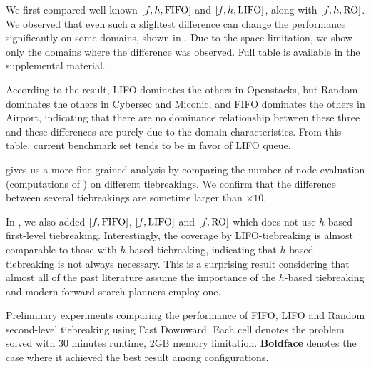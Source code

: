 We first compared well known $[f,h,\mbox{FIFO}]$ and $[f,h,\mbox{LIFO}]$, along with
$[f,h,\mbox{RO}]$.
We observed that even such a slightest difference
can change the performance significantly on some domains, shown in
. Due to the space limitation, we show only the
domains where the difference was observed. Full table is available in
the supplemental material.

According to the result, LIFO dominates the others in Openstacks, but
Random dominates the others in Cybersec and Miconic, and FIFO dominates the others
in Airport, indicating that there are no dominance relationship between
these three and these differences are purely due to the
domain characteristics.
From this table, current benchmark set tends to be in favor of LIFO queue.

 gives us a more fine-grained analysis by comparing the
number of node evaluation (computations of \lmcut) on
different tiebreakings. We confirm that the difference between several
tiebreakings are sometime larger than $\times 10$.

In , we also added $[f,\mbox{FIFO}]$, $[f,\mbox{LIFO}]$ and
$[f,\mbox{RO}]$ which does not use $h$-based first-level tiebreaking.
Interestingly, the coverage by LIFO-tiebreaking is almost comparable to
those with $h$-based tiebreaking, indicating that $h$-based tiebreaking
is not always necessary.  This is a surprising result considering
that almost all of the past literature assume the importance of the
$h$-based tiebreaking and modern forward search planners employ one.


% 
\begin{table}[htbp]
 \centering {}
 
 \caption{Preliminary experiments comparing the performance of FIFO,
 LIFO and Random second-level tiebreaking using Fast Downward. Each cell
 denotes the problem solved with 30 minutes runtime, 2GB memory
 limitation. \textbf{Boldface} denotes the case where it achieved the
 best result among configurations.} \label{single-coverage}
\end{table}

